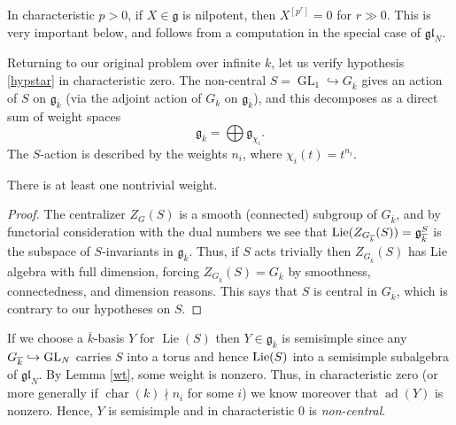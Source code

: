 \documentclass[10pt]{article}
\renewcommand{\(}{\left(}
\renewcommand{\)}{\right)}
\numberwithin{thm}{subsection}
\begin{document}
\begin{remark}\label{nilx}
In characteristic $p > 0$, if $X\in \mathfrak{g}$ is nilpotent, then $X^{[p^r]}=0$ for $r\gg 0$.
This is very important below, and follows from a computation in the special case
of $\mathfrak{gl}_N$. 
\end{remark}

Returning to our original problem over infinite $k$, 
let us verify hypothesis \eqref{hypstar} in characteristic zero.
The non-central $S=\operatorname{GL}_1\hookrightarrow G_{\overline{k}}$ gives
an action of $S$ on $\mathfrak{g}_{\overline{k}}$ (via 
the adjoint action of $G_{\overline{k}}$ on $\mathfrak{g}_{\overline{k}}$),  
and this decomposes as a direct sum of weight spaces 
$$\mathfrak{g}_{\overline{k}}=\bigoplus \mathfrak{g}_{\chi_i}.$$
The $S$-action is described by the weights $n_i$, where $\chi_i(t)=t^{n_i}$.

\begin{lemma}\label{wt}
There is at least one nontrivial weight.
\end{lemma}

\begin{proof}
The centralizer $Z_G(S)$ is a smooth (connected) subgroup of $G_{\overline{k}}$,
and by functorial consideration with the dual numbers we see that
${\rm{Lie}}(Z_{G_{\overline{k}}}(S)) = \mathfrak{g}_{\overline{k}}^S$ 
is the subspace of $S$-invariants in $\mathfrak{g}_{\overline{k}}$.
Thus, if $S$ acts trivially then $Z_{G_{\overline{k}}}(S)$ has Lie algebra with full dimension, forcing
$Z_{G_{\overline{k}}}(S) = G_{\overline{k}}$ by smoothness, connectedness, and dimension reasons.
This says that $S$ is central in $G_{\overline{k}}$, which is contrary to our hypotheses on $S$. 
\end{proof}

If we choose a $\overline{k}$-basis $Y$
for $\operatorname{Lie}(S)$ then 
$Y \in \mathfrak{g}_{\overline{k}}$ is semisimple
since any $G_{\overline{k}} \hookrightarrow {\rm{GL}}_N$ carries
$S$ into a torus and hence ${\rm{Lie}}(S)$ into a semisimple
subalgebra of $\mathfrak{gl}_N$. 
By Lemma \ref{wt}, some weight is nonzero.
Thus, in characteristic zero (or more generally if $\operatorname{char}(k)\nmid n_i$ for some $i$)
we know moreover that $\operatorname{ad}(Y)$ is nonzero.
Hence, $Y$ is semisimple and in characteristic 0 is {\em non-central}. 
\end{document}
